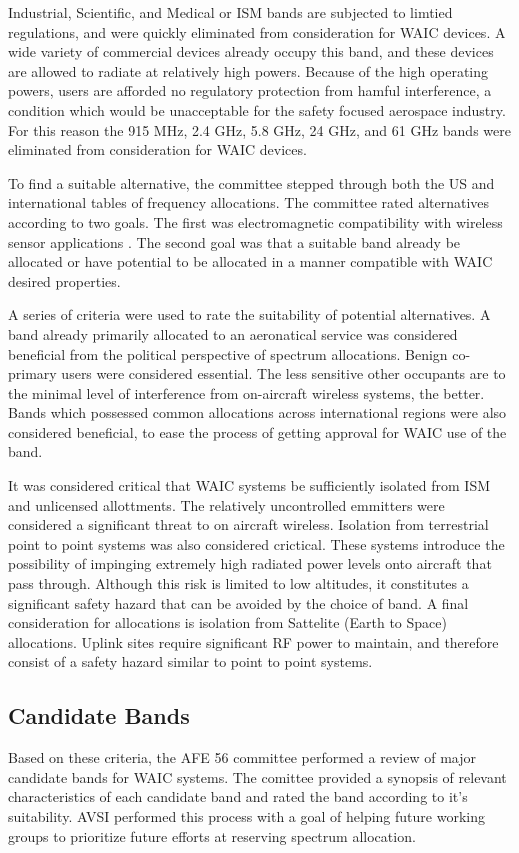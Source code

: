 Industrial, Scientific, and Medical or ISM bands are subjected to limtied regulations, and were quickly eliminated from consideration for WAIC devices. A wide variety of commercial devices already occupy this band, and these devices are allowed to radiate at relatively high powers. Because of the high operating powers, users are afforded no regulatory protection from hamful interference, a condition which would be unacceptable for the safety focused aerospace industry. For this reason the 915 MHz, 2.4 GHz, 5.8 GHz, 24 GHz, and 61 GHz bands were eliminated from consideration for WAIC devices. 


To find a suitable alternative, the committee stepped through both the US and international tables of frequency allocations. The committee rated alternatives according to two goals. The first was electromagnetic compatibility with wireless sensor applications . The second goal was that a suitable band already be allocated or have potential to be allocated in a manner compatible with WAIC desired properties. 

A series of criteria were used to rate the suitability of potential alternatives. A band already primarily allocated to an aeronatical service was considered beneficial from the political perspective of spectrum allocations. Benign co-primary users were considered essential. The less sensitive other occupants are to the minimal level of interference from on-aircraft wireless systems, the better. Bands which possessed common allocations across international regions were also considered beneficial, to ease the process of getting approval for WAIC use of the band. 

It was considered critical that WAIC systems be sufficiently isolated from ISM and unlicensed allottments. The relatively uncontrolled emmitters were considered a significant threat to on aircraft wireless. Isolation from terrestrial point to point systems was also considered crictical. These systems introduce the possibility of impinging extremely high radiated power levels onto aircraft that pass through. Although this risk is limited to low altitudes, it constitutes a significant safety hazard that can be avoided by the choice of band. A final consideration for allocations is isolation from Sattelite (Earth to Space) allocations. Uplink sites require significant RF power to maintain, and therefore consist of a safety hazard similar to point to point systems. 

\subsection{Candidate Bands}
Based on these criteria, the AFE 56 committee performed a review of major candidate bands for WAIC systems. The comittee provided a synopsis of relevant characteristics of each candidate band and rated the band according to it's suitability. AVSI performed this process with a goal of helping future working groups to prioritize future efforts at reserving spectrum allocation. 

